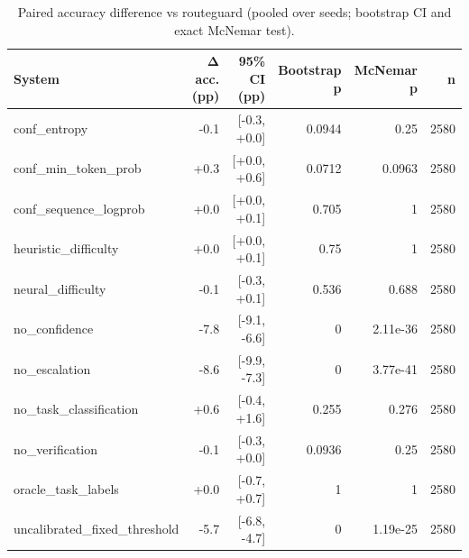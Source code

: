\begin{table}[t]
\centering
\small
\caption{Paired accuracy difference vs routeguard (pooled over seeds; bootstrap CI and exact McNemar test).}
\label{tab:significance}
\begin{tabular}{lrrrrr}
\toprule
System & Δ acc. (pp) & 95\% CI (pp) & Bootstrap p & McNemar p & n \\
\midrule
conf\_entropy & -0.1 & [-0.3, +0.0] & 0.0944 & 0.25 & 2580 \\
conf\_min\_token\_prob & +0.3 & [+0.0, +0.6] & 0.0712 & 0.0963 & 2580 \\
conf\_sequence\_logprob & +0.0 & [+0.0, +0.1] & 0.705 & 1 & 2580 \\
heuristic\_difficulty & +0.0 & [+0.0, +0.1] & 0.75 & 1 & 2580 \\
neural\_difficulty & -0.1 & [-0.3, +0.1] & 0.536 & 0.688 & 2580 \\
no\_confidence & -7.8 & [-9.1, -6.6] & 0 & 2.11e-36 & 2580 \\
no\_escalation & -8.6 & [-9.9, -7.3] & 0 & 3.77e-41 & 2580 \\
no\_task\_classification & +0.6 & [-0.4, +1.6] & 0.255 & 0.276 & 2580 \\
no\_verification & -0.1 & [-0.3, +0.0] & 0.0936 & 0.25 & 2580 \\
oracle\_task\_labels & +0.0 & [-0.7, +0.7] & 1 & 1 & 2580 \\
uncalibrated\_fixed\_threshold & -5.7 & [-6.8, -4.7] & 0 & 1.19e-25 & 2580 \\
\bottomrule
\end{tabular}
\end{table}
